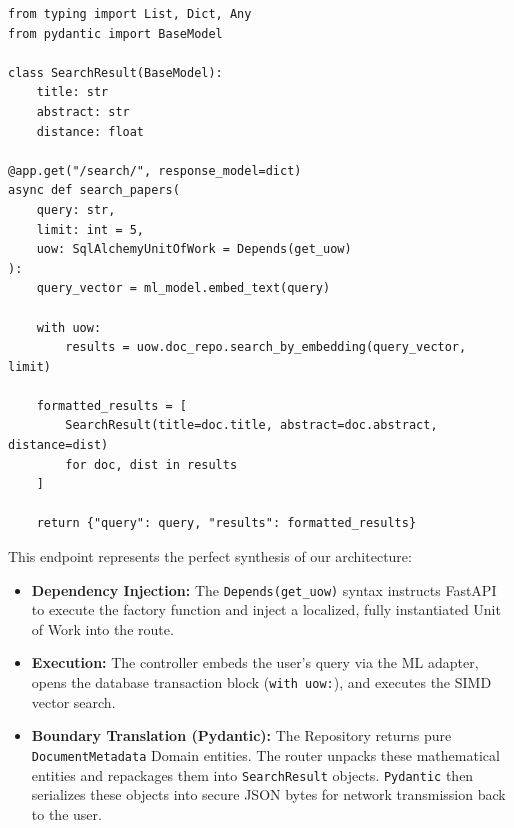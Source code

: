 \begin{lstlisting}[caption={Dependency Injection and Semantic Search}]
from typing import List, Dict, Any
from pydantic import BaseModel

class SearchResult(BaseModel):
    title: str
    abstract: str
    distance: float

@app.get("/search/", response_model=dict)
async def search_papers(
    query: str,
    limit: int = 5,
    uow: SqlAlchemyUnitOfWork = Depends(get_uow)
):
    query_vector = ml_model.embed_text(query)

    with uow:
        results = uow.doc_repo.search_by_embedding(query_vector, limit)

    formatted_results = [
        SearchResult(title=doc.title, abstract=doc.abstract, distance=dist)
        for doc, dist in results
    ]

    return {"query": query, "results": formatted_results}
\end{lstlisting}

This endpoint represents the perfect synthesis of our architecture:
\begin{itemize}
    \item \textbf{Dependency Injection:} The \texttt{Depends(get\_uow)} syntax instructs FastAPI to execute the factory function and inject a localized, fully instantiated Unit of Work into the route.
    \item \textbf{Execution:} The controller embeds the user's query via the ML adapter, opens the database transaction block (\texttt{with uow:}), and executes the SIMD vector search.
    \item \textbf{Boundary Translation (Pydantic):} The Repository returns pure \texttt{DocumentMetadata} Domain entities. The router unpacks these mathematical entities and repackages them into \texttt{SearchResult} objects. \texttt{Pydantic} then serializes these objects into secure JSON bytes for network transmission back to the user.
\end{itemize}
